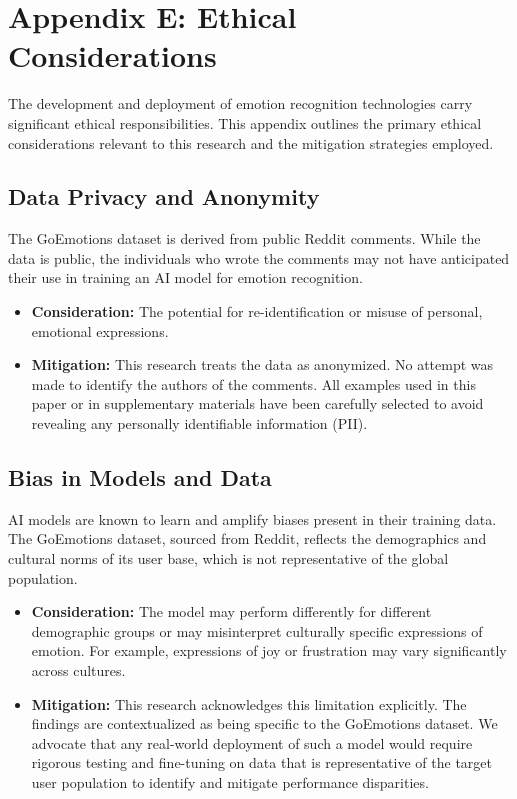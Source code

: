 
\chapter{Appendix E: Ethical Considerations}
\label{app:ethics}

The development and deployment of emotion recognition technologies carry significant ethical responsibilities. This appendix outlines the primary ethical considerations relevant to this research and the mitigation strategies employed.

\section{Data Privacy and Anonymity}

The GoEmotions dataset is derived from public Reddit comments. While the data is public, the individuals who wrote the comments may not have anticipated their use in training an AI model for emotion recognition.
\begin{itemize}
    \item \textbf{Consideration:} The potential for re-identification or misuse of personal, emotional expressions.
    \item \textbf{Mitigation:} This research treats the data as anonymized. No attempt was made to identify the authors of the comments. All examples used in this paper or in supplementary materials have been carefully selected to avoid revealing any personally identifiable information (PII).
\end{itemize}

\section{Bias in Models and Data}

AI models are known to learn and amplify biases present in their training data. The GoEmotions dataset, sourced from Reddit, reflects the demographics and cultural norms of its user base, which is not representative of the global population.
\begin{itemize}
    \item \textbf{Consideration:} The model may perform differently for different demographic groups or may misinterpret culturally specific expressions of emotion. For example, expressions of joy or frustration may vary significantly across cultures.
    \item \textbf{Mitigation:} This research acknowledges this limitation explicitly. The findings are contextualized as being specific to the GoEmotions dataset. We advocate that any real-world deployment of such a model would require rigorous testing and fine-tuning on data that is representative of the target user population to identify and mitigate performance disparities.
\end{itemize}

